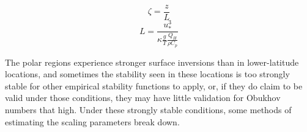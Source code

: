 \begin{equation}\label{eq:zl}
\zeta = \frac{z}{L}
\end{equation}
\begin{equation}\label{eq:l}
L = \frac{u_{*}^{3}}{\kappa \frac{g}{T} \frac{Q_{H}}{\rho C_{p}}}
\end{equation}

The polar regions experience stronger surface inversions than in lower-latitude locations, and sometimes the stability seen in these locations is too strongly stable for other empirical stability functions to apply, or, if they do claim to be valid under those conditions, they may have little validation for Obukhov numbers that high. Under these strongly stable conditions, some methods of estimating the scaling parameters break down. 


